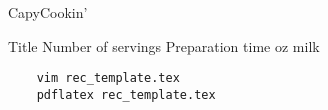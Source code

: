 \documentclass{article}
\begin{document}
\begin{center}
 {\LARGE CapyCookin'}
\end{center}
\bigskip

%



\begin{recipe}{Title} {Number of servings} {Preparation time}
 {oz} {milk}



\end{recipe}

\begin{verbatim}
    vim rec_template.tex
    pdflatex rec_template.tex
\end{verbatim}
\end{document}
